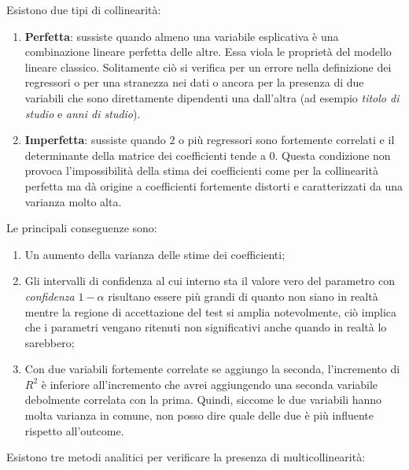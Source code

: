 \documentclass[a4page, 11pt]{article} %
\begin{document}
Esistono due tipi di collinearità:
\begin{enumerate}[noitemsep]
\item \textbf{Perfetta}: sussiste quando almeno una variabile esplicativa è una combinazione lineare perfetta delle altre. Essa viola le proprietà del modello lineare classico. Solitamente ciò si verifica per un errore nella definizione dei regressori o per una stranezza nei dati o ancora per la presenza di due variabili che sono direttamente dipendenti una dall'altra (ad esempio \textit{titolo di studio} e \textit{anni di studio}).
\item \textbf{Imperfetta}: sussiste quando $2$ o più regressori sono fortemente correlati e il determinante della matrice dei coefficienti tende a $0$. Questa condizione non provoca l'impossibilità della stima dei coefficienti come per la collinearità perfetta ma dà origine a coefficienti fortemente distorti e caratterizzati da una varianza molto alta.
\end{enumerate}
Le principali conseguenze sono:
\begin{enumerate}[noitemsep]
\item Un aumento della varianza delle stime dei coefficienti;
\item Gli intervalli di confidenza al cui interno sta il valore vero del parametro con \textit{confidenza} $1-\alpha$ risultano essere più grandi di quanto non siano in realtà mentre la regione di accettazione del test si amplia notevolmente, ciò implica che i parametri vengano ritenuti non significativi anche quando in realtà lo sarebbero;
\item Con due variabili fortemente correlate se aggiungo la seconda, l’incremento di $R^{2}$ è inferiore all’incremento che avrei aggiungendo una seconda variabile debolmente correlata con la prima. Quindi, siccome le due variabili hanno molta varianza in comune, non posso dire quale delle due è più influente rispetto all’outcome.
\end{enumerate}
Esistono tre metodi analitici per verificare la presenza di multicollinearità:
\end{document}
